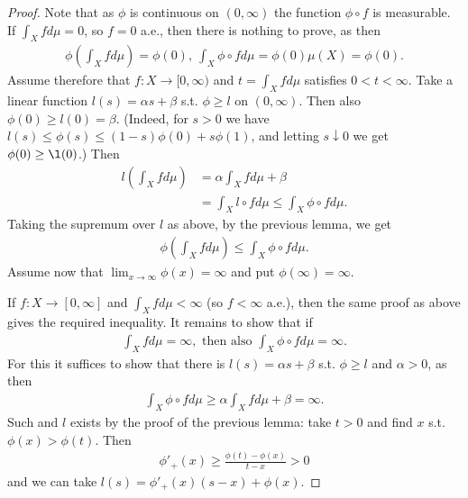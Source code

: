 \ifdetailed 
\begin{proof}
    Note that as \(\phi\) is continuous on \((0,\infty)\) the function \(\phi\circ f\) is measurable. If \(\int_X fd\mu=0\), so \(f=0\) a.e., then there is nothing to prove, as then
    \begin{align*}
        \phi\left(\int_X fd\mu\right) = \phi(0), \ \int_X \phi\circ fd\mu = \phi(0)\mu(X) = \phi(0).
    \end{align*}
    Assume therefore that \(f:X\rightarrow[0,\infty)\) and \(t=\int_X fd\mu\) satisfies \(0<t<\infty\). Take a linear function \(l(s) = \alpha s + \beta\) s.t. \(\phi\geq l\) on \((0,\infty)\). Then also \(\phi(0)\geq l(0)=\beta\). (Indeed, for \(s>0\) we have \(l(s) \leq \phi(s) \leq (1-s)\phi(0) + s\phi(1)\), and letting \(s\downarrow 0\) we get \(\phi(0)\geq \l(0)\).) Then 
    \begin{align*}
        l\left(\int_X fd\mu\right) &= \alpha \int_X fd\mu + \beta \\
        &=\int_X l\circ fd\mu \leq \int_X \phi\circ fd\mu.
    \end{align*}
    Taking the supremum over \(l\) as above, by the previous lemma, we get 
    \begin{align*}
        \phi\left(\int_X fd\mu\right) \leq \int_X \phi\circ fd\mu.
    \end{align*}
    Assume now that \(\lim_{x\rightarrow\infty}\phi(x) = \infty\) and put \(\phi(\infty) = \infty\). 

    If \(f:X\rightarrow [0,\infty]\) and \(\int_X fd\mu<\infty\) (so \(f<\infty\) a.e.), then the same proof as above gives the required inequality. It remains to show that if 
    \begin{align*}
        \int_X fd\mu = \infty, \text{ then also } \int_X \phi\circ fd\mu=\infty.
    \end{align*}
    For this it suffices to show that there is \(l(s)=\alpha s + \beta\) s.t. \(\phi\geq l\) and \(\alpha>0\), as then 
    \begin{align*}
        \int_X \phi\circ fd\mu \geq \alpha\int_X fd\mu + \beta = \infty.
    \end{align*}
    Such and \(l\) exists by the proof of the previous lemma: take \(t>0\) and find \(x\) s.t. \(\phi(x) >\phi(t)\). Then 
    \begin{align*}
        \phi'_{+}(x) \geq \frac{\phi(t) - \phi(x)}{t-x}>0 
    \end{align*}
    and we can take \(l(s) = \phi'_{+} (x) (s-x) + \phi(x)\).
\end{proof}
\fi 